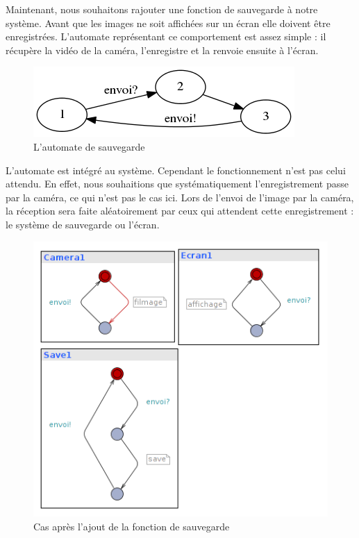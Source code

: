 \documentclass[12pt,a4paper]{report}
\begin{document}
    Maintenant, nous souhaitons rajouter une fonction de sauvegarde à notre système. 
    Avant que les images ne soit affichées sur un écran elle doivent être enregistrées. 
    L'automate représentant ce comportement est assez simple : il récupère la vidéo de la 
    caméra, l'enregistre et la renvoie ensuite à l'écran.

\begin{figure}[H]
  \centering
  \includegraphics[scale=0.6]{ressources/save.png}
  \caption{L'automate de sauvegarde}
\end{figure} 

\newpage
    L'automate est intégré au système. Cependant le fonctionnement n'est pas celui attendu. En effet, nous souhaitions que systématiquement l'enregistrement passe par la caméra, ce qui n'est pas le cas ici. Lors de l'envoi de l'image par la caméra, la réception sera faite aléatoirement par ceux qui attendent cette enregistrement : le système de sauvegarde ou l'écran.
    
\begin{figure}[H]
  \centering
  \includegraphics[scale=0.6]{ressources/cameraSave.png}
  \caption{Cas après l'ajout de la fonction de sauvegarde}
\end{figure}     
    
\end{document}
